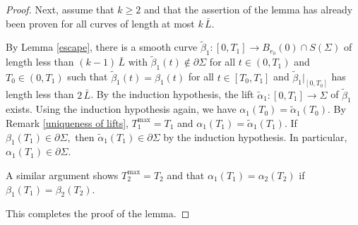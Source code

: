 \documentclass[11pt]{amsart}
\begin{document}
\begin{proof}
		Next, assume that $k\geq 2$ and that the assertion of the lemma has already been proven for all curves of length at most $k\,\bar L$. 
		
	By Lemma \ref{escape},
	 there is a smooth curve $ \tilde \beta_1:[0,T_1]\to B_{r_0}(0)\cap S(\Sigma)$ of length less than $(k-1)\,\bar L$ with $\tilde \beta_1(t)\notin \partial \Sigma$ for all $t\in(0,T_1)$  and $T_0\in(0, T_1)$  such that $ \tilde \beta_1(t)=\beta_1(t)$ for all $t\in[T_0,T_1]$ and $\tilde \beta_1|_{[0,T_0]}$ has length less than $2\,\bar L$. By the induction hypothesis, the lift $\tilde \alpha_1:[0,T_1]\to \Sigma$ of $\tilde \beta_1$ exists. Using the induction hypothesis again, we have	
	 $ \alpha_1(T_0)=\tilde \alpha_1(T_0).$ By Remark \ref{uniqueness of lifts}, $T^{\max}_1= T_1$ and $\alpha_1(T_1)=\tilde \alpha_1(T_1)$. If $\beta_1(T_1)\in \partial \Sigma,$ then  $\tilde \alpha_1(T_1)\in \partial \Sigma$ by the induction hypothesis. In particular, $\alpha_1(T_1)\in \partial \Sigma$. 
	 
	 A similar argument shows $T^{\max}_2=T_2$ and that $\alpha_1(T_1)=\alpha_2(T_2)$ if $\beta_1(T_1)=\beta_2(T_2)$.
	 
	 This completes the proof of the lemma. 
	\end{proof}
\end{document}
